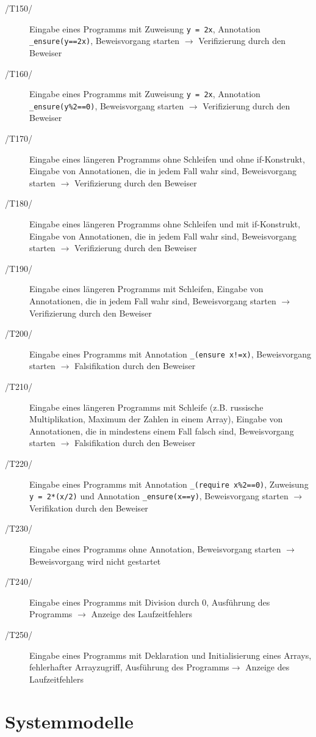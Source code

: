 \documentclass[a4paper,10pt]{article}
\begin{document}
\begin{description}
\item[/T150/] Eingabe eines Programms mit Zuweisung \texttt{y = 2x}, Annotation \texttt{\_ensure(y==2x)}, Beweisvorgang starten $\to$ Verifizierung durch den Beweiser
\item[/T160/] Eingabe eines Programms mit Zuweisung \texttt{y = 2x}, Annotation \texttt{\_ensure(y\%2==0)}, Beweisvorgang starten $\to$ Verifizierung durch den Beweiser
\item[/T170/] Eingabe eines längeren Programms ohne Schleifen und ohne if-Konstrukt, Eingabe von Annotationen, die in jedem Fall wahr sind, Beweisvorgang starten $\to$ Verifizierung durch den Beweiser
\item[/T180/] Eingabe eines längeren Programms ohne Schleifen und mit if-Konstrukt, Eingabe von Annotationen, die in jedem Fall wahr sind, Beweisvorgang starten $\to$ Verifizierung durch den Beweiser
\item[/T190/] Eingabe eines längeren Programms mit Schleifen, Eingabe von Annotationen, die in jedem Fall wahr sind, Beweisvorgang starten $\to$ Verifizierung durch den Beweiser
\item[/T200/] Eingabe eines Programms mit Annotation \texttt{\_(ensure x!=x)}, Beweisvorgang starten $\to$ Falsifikation durch den Beweiser
\item[/T210/] Eingabe eines längeren Programms mit Schleife (z.B. russische Multiplikation, Maximum der Zahlen in einem Array), Eingabe von Annotationen, die in mindestens einem Fall falsch sind, Beweisvorgang starten $\to$ Falsifikation durch den Beweiser
\item[/T220/] Eingabe eines Programms mit Annotation \texttt{\_(require x\%2==0)}, Zuweisung \texttt{y = 2*(x/2)} und Annotation \texttt{\_ensure(x==y)}, Beweisvorgang starten $\to$ Verifikation durch den Beweiser
\item[/T230/] Eingabe eines Programms ohne Annotation, Beweisvorgang starten $\to$ Beweisvorgang wird nicht gestartet
\item[/T240/] Eingabe eines Programms mit Division durch 0, Ausführung des Programms $\to$ Anzeige des Laufzeitfehlers
\item[/T250/] Eingabe eines Programms mit Deklaration und Initialisierung eines Arrays, fehlerhafter Arrayzugriff, Ausführung des Programms$\to$ Anzeige des Laufzeitfehlers
\end{description}

\section{Systemmodelle}
\end{document}
